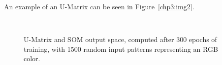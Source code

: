 An example of an \ac{U-Matrix} can be seen in Figure~\ref{chp3:img2}.

\begin{figure}[htpb]
  \centering
  \hspace*{0.5cm}
  \\
  \caption{U-Matrix and SOM output space, computed after 300 epochs of training, with 1500 random input patterns representing an RGB color.}
  \label{fig:umatrix_and_ouputspace}
\end{figure}


